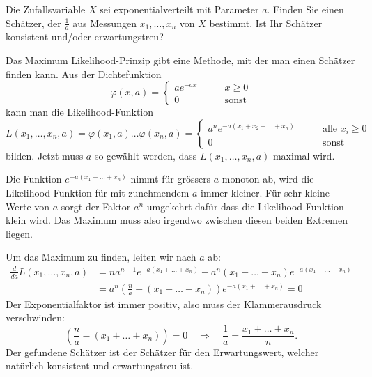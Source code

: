 Die Zufallsvariable $X$ sei exponentialverteilt mit Parameter $a$.
Finden Sie einen Schätzer, der $\frac1a$ aus Messungen $x_1,\dots,x_n$
von $X$ bestimmt. Ist Ihr Schätzer konsistent und/oder erwartungstreu?


\begin{loesung}
Das Maximum Likelihood-Prinzip gibt eine Methode, mit der man einen
Schätzer finden kann. Aus der Dichtefunktion
\[
\varphi(x,a)=\begin{cases}
ae^{-ax}&\qquad x \ge 0\\
0&\qquad\text{sonst}
\end{cases}
\]
kann man die Likelihood-Funktion
\[
L(x_1,\dots,x_n,a)=\varphi(x_1,a)\dots\varphi(x_n,a)=
\begin{cases}
a^ne^{-a(x_1+x_2+\dots+x_n)}&\qquad \text{alle $x_i \ge 0$}\\
0&\qquad\text{sonst}
\end{cases}
\]
bilden.
Jetzt muss $a$ so gewählt werden, dass $L(x_1,\dots,x_n,a)$
maximal wird.

Die Funktion $e^{-a(x_1+\dots+x_n)}$ nimmt für grössers $a$ monoton ab,
wird die Likelihood-Funktion für mit zunehmendem $a$ immer kleiner. Für
sehr kleine Werte von $a$ sorgt der Faktor $a^n$ umgekehrt dafür dass
die Likelihood-Funktion klein wird. Das Maximum muss also irgendwo
zwischen diesen beiden Extremen liegen.

Um das Maximum zu finden, leiten wir nach $a$ ab:
\begin{align*}
\frac{d}{da}L(x_1,\dots,x_n,a)&=na^{n-1}e^{-a(x_1+\dots+x_n)}-a^n(x_1+\dots+x_n)e^{-a(x_1+\dots+x_n)}\\
&=a^n
\left(\frac{n}a-(x_1+\dots+x_n)\right)
e^{-a(x_1+\dots+x_n)}=0
\end{align*}
Der Exponentialfaktor ist immer positiv, also muss der Klammerausdruck
verschwinden:
\[
\left(\frac{n}a-(x_1+\dots+x_n)\right)=0
\quad\Rightarrow\quad
\frac1a=\frac{x_1+\dots+x_n}{n}.
\]
Der gefundene Schätzer ist der Schätzer für den Erwartungswert,
welcher natürlich konsistent und erwartungstreu ist.
\end{loesung}

